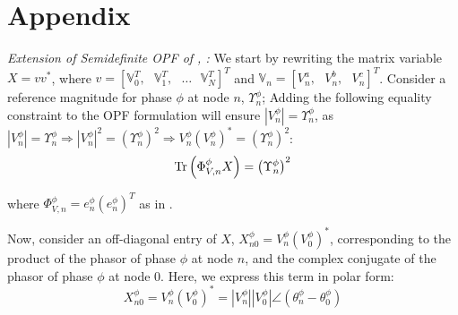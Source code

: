 \section*{Appendix}
\label{sec:appendix}

\emph{Extension of Semidefinite OPF of \cite{dall2012optimization}, \cite{dall2013distributed}: } We start by rewriting the matrix variable $X = v {v}^{*}$, where $v = {\left[ \mathbb{V}_{0}^{T}, \text{ } \mathbb{V}_{1}^{T}, \text{ } \ldots \text{ } \mathbb{V}_{N}^{T} \right]}^{T}$ and $\mathbb{V}_{n} = {\left[ V_{n}^{a}, \text{ } V_{n}^{b}, \textbf{ } V_{n}^{c} \right]}^{T}$. Consider a reference magnitude for phase $\phi$ at node $n$, $\Upsilon_{n}^{\phi}$; Adding the following equality constraint to the OPF formulation will ensure  $\left| V_{n}^{\phi} \right| = \Upsilon_{n}^{\phi}$, as $\left| V_{n}^{\phi} \right| = \Upsilon_{n}^{\phi} \Rightarrow \left| V_{n}^{\phi} \right|^{2} = {\left( \Upsilon_{n}^{\phi} \right)}^{2} \Rightarrow V_{n}^{\phi} {\left( V_{n}^{\phi} \right)}^{*} = {\left( \Upsilon_{n}^{\phi} \right)}^{2}$:
\begin{equation}
	\operatorname{Tr} \left( \Phi_{V,n}^{\phi} X \right) = {\left( \Upsilon_{n}^{\phi} \right)}^{2}
\end{equation}

\noindent where $\Phi_{V,n}^{\phi} = e_{n}^{\phi} {\left( e_{n}^{\phi} \right)}^{T}$ as in \cite{dall2012optimization}.

Now, consider an off-diagonal entry of $X$, $X_{n0}^{\phi} = V_{n}^{\phi} {\left( V_{0}^{\phi} \right)}^{*}$, corresponding to the product of the phasor of phase $\phi$ at node $n$, and the complex conjugate of the phasor of phase $\phi$ at node 0. Here, we express this term in polar form:
\begin{equation}
	X_{n0}^{\phi} = V_{n}^{\phi} {\left( V_{0}^{\phi} \right)}^{*} = \left| V_{n}^{\phi} \right| \left| V_{0}^{\phi} \right| \angle \left( \theta_{n}^{\phi} - \theta_{0}^{\phi} \right) \label{VnV0polar}
\end{equation}

